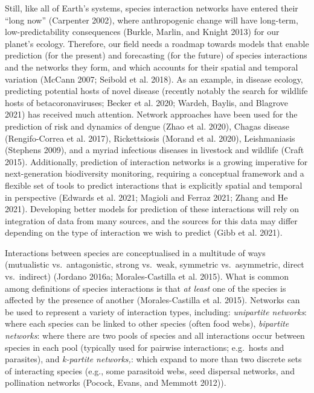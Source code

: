 \documentclass[10pt,oneside]{article}
\begin{document}
Still, like all of Earth's systems, species interaction networks have
entered their ``long now'' (Carpenter 2002), where anthropogenic change
will have long-term, low-predictability consequences (Burkle, Marlin,
and Knight 2013) for our planet's ecology. Therefore, our field needs a
roadmap towards models that enable prediction (for the present) and
forecasting (for the future) of species interactions and the networks
they form, and which accounts for their spatial and temporal variation
(McCann 2007; Seibold et al. 2018). As an example, in disease ecology,
predicting potential hosts of novel disease (recently notably the search
for wildlife hosts of betacoronaviruses; Becker et al. 2020; Wardeh,
Baylis, and Blagrove 2021) has received much attention. Network
approaches have been used for the prediction of risk and dynamics of
dengue (Zhao et al. 2020), Chagas disease (Rengifo-Correa et al. 2017),
Rickettsiosis (Morand et al. 2020), Leishmaniasis (Stephens 2009), and a
myriad infectious diseases in livestock and wildlife (Craft 2015).
Additionally, prediction of interaction networks is a growing imperative
for next-generation biodiversity monitoring, requiring a conceptual
framework and a flexible set of tools to predict interactions that is
explicitly spatial and temporal in perspective (Edwards et al. 2021;
Magioli and Ferraz 2021; Zhang and He 2021). Developing better models
for prediction of these interactions will rely on integration of data
from many sources, and the sources for this data may differ depending on
the type of interaction we wish to predict (Gibb et al. 2021).

Interactions between species are conceptualised in a multitude of ways
(mutualistic vs.~antagonistic, strong vs.~weak, symmetric
vs.~asymmetric, direct vs.~indirect) (Jordano 2016a; Morales-Castilla et
al. 2015). What is common among definitions of species interactions is
that \emph{at least} one of the species is affected by the presence of
another (Morales-Castilla et al. 2015). Networks can be used to
represent a variety of interaction types, including: \emph{unipartite
networks}: where each species can be linked to other species (often food
webs), \emph{bipartite networks}: where there are two pools of species
and all interactions occur between species in each pool (typically used
for pairwise interactions; e.g.~hosts and parasites), and
\emph{k-partite networks,}: which expand to more than two discrete sets
of interacting species (e.g., some parasitoid webs, seed dispersal
networks, and pollination networks (Pocock, Evans, and Memmott 2012)).
\end{document}
